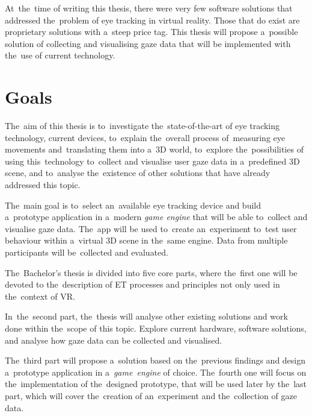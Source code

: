 \documentclass[english,bachelor,unicode]{ctufit-thesis}
\theoremstyle{plain}
\theoremstyle{definition}
\theoremstyle{remark}
\numberwithin{theorem}{chapter}
\begin{document}
\medskip
At~the~time of writing this thesis, there were very few software solutions that addressed the~problem of eye tracking in virtual reality. Those that do exist are proprietary solutions with a~steep price tag. This thesis will propose a~possible solution of collecting and visualising gaze data that will be implemented with the~use of current technology.

\section{Goals}

The~aim of this thesis is to~investigate the~state-of-the-art of eye tracking technology, current devices, to~explain the~overall process of~measuring eye movements and~translating them into a~3D world, to~explore the~possibilities of using this~technology to~collect and visualise user gaze data in a~predefined 3D scene, and to~analyse the~existence of other solutions that have already addressed this topic.


The~main goal is to~select an~available eye tracking device and build a~prototype application in a~modern \emph{game engine} that will be able to~collect and visualise gaze data. The~app will be used to~create an~experiment to~test user behaviour within a~virtual 3D scene in the~same engine. Data from multiple participants will be~collected and evaluated. 


\bigskip

The~Bachelor's thesis is divided into five core parts, where the~first one will be devoted to the~description of ET processes and principles not only used in the~context of VR.

In~the~second part, the~thesis will analyse other existing solutions and work done within the~scope of this topic. Explore current hardware, software solutions, and analyse how gaze data can be collected and visualised.

The~third part will propose a~solution based on the~previous findings and design a~prototype application in a~\emph{game~engine} of choice. The~fourth one will focus on the~implementation of the~designed prototype, that will be used later by the~last part, which will cover the~creation of an~experiment and the~collection of gaze data.






\end{document}

